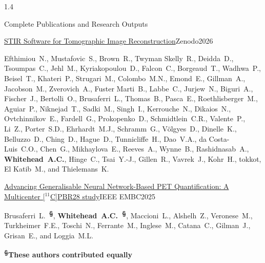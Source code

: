 \documentclass{cv}
\begin{document}
\begin{spacing}{1.4}
\begin{rSection}{Complete Publications and Research Outputs}
            \vspace{-0.5cm}
            \item \begin{rSubsection}{\href{https://doi.org/10.5281/zenodo.20415609}{STIR Software for Tomographic Image Reconstruction}}{}{Zenodo}{2026}
                \vspace{-0.25cm}
                \item Efthimiou~N., Mustafovic~S., Brown~R., Twyman Skelly~R., Deidda~D., Tsoumpas~C., Jehl~M., Kyriakopoulou~D., Falcon~C., Borgeaud~T., Wadhwa~P., Beisel~T., Khateri~P., Strugari~M., Colombo~M.N., Emond~E., Gillman~A., Jacobson~M., Zverovich~A., Fuster Marti~B., Labbe~C., Jurjew~N., Biguri~A., Fischer~J., Bertolli~O., Brusaferri~L., Thomas~B., Pasca~E., Roethlisberger~M., Aguiar~P., Niknejad~T., Sadki~M., Singh~I., Kerrouche~N., Dikaios~N., Ovtchinnikov~E., Fardell~G., Prokopenko~D., Schmidtlein~C.R., Valente~P., Li~Z., Porter~S.D., Ehrhardt~M.J., Schramm~G., Völgyes~D., Dinelle~K., Belluzzo~D., Ching~D., Hague~D., Tunnicliffe~H., Dao~V.A., da Costa-Luis~C.O., Chen~G., Mikhaylova~E., Reeves~A., Wynne~B., Rashidnasab~A., \textbf{Whitehead~A.C.}, Hinge~C., Tsai~Y.-J., Gillen~R., Vavrek~J., Kohr~H., tokkot, El Katib~M., and Thielemans~K.
                \\
            \end{rSubsection}
    
            \vspace{-0.5cm}
            \item \begin{rSubsection}{\href{https://doi.org/10.1109/EMBC58623.2025.11251612}{Advancing Generalisable Neural Network-Based PET Quantification: A Multicenter [$^{11}$C]PBR28 study}}{}{IEEE EMBC}{2025}
                \vspace{-0.25cm}
                \item Brusaferri~L.~\textbf{\textsuperscript{\S}}, \textbf{Whitehead~A.C.~\textsuperscript{\S}}, Maccioni~L., Alshelh~Z., Veronese~M., Turkheimer~F.E., Toschi~N., Ferrante~M., Inglese~M., Catana~C., Gilman~J., Grisan~E., and Loggia~M.L. \\
                \vspace{-0.25cm}
                \item \textbf{\textsuperscript{\S}These authors contributed equally} \\
                \\
            \end{rSubsection}


\end{rSection}
\end{spacing}
\end{document}
